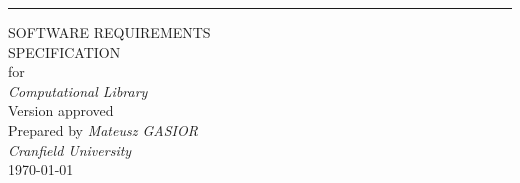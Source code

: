 \begin{flushright}
    \rule{16cm}{5pt}\vskip1cm
    \begin{bfseries}
        \Huge{SOFTWARE REQUIREMENTS\\ SPECIFICATION}\\
        \vspace{1.9cm}
        for\\
        \vspace{1.9cm}
	    \textit{Computational Library}\\
        \vspace{1.9cm}
        \LARGE{Version \myversion approved}\\
        \vspace{1.9cm}
        Prepared by \textit{Mateusz GASIOR}\\
        \vspace{1.9cm}
        \textit{Cranfield University}\\
        \vspace{1.9cm}
        \today\\
    \end{bfseries}
\end{flushright}